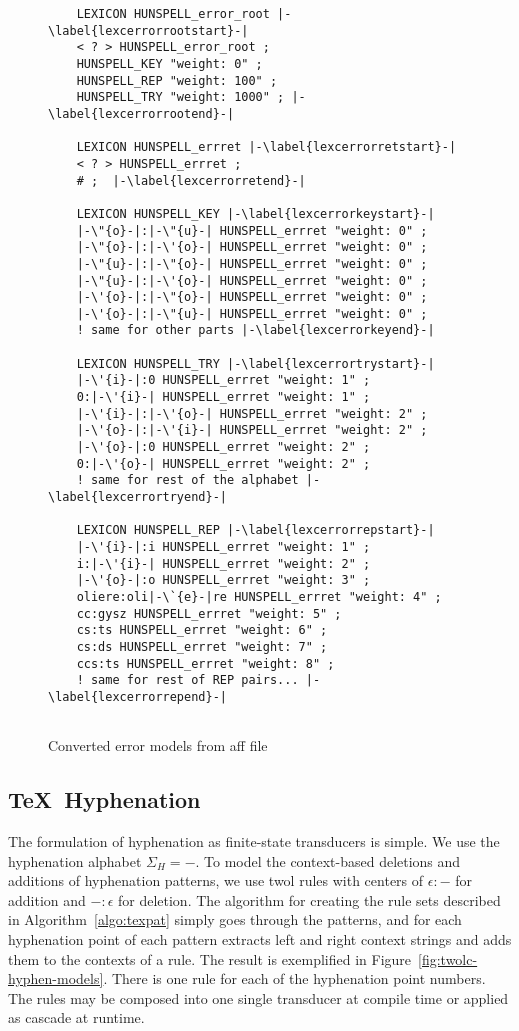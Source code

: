\documentclass[a4paper,conference]{IEEEtran}
\begin{document}
\begin{figure}[tbp]
  \centering
  \begin{lstlisting}
    LEXICON HUNSPELL_error_root |-\label{lexcerrorrootstart}-|
    < ? > HUNSPELL_error_root ; 
    HUNSPELL_KEY "weight: 0" ;
    HUNSPELL_REP "weight: 100" ;
    HUNSPELL_TRY "weight: 1000" ; |-\label{lexcerrorrootend}-|
    
    LEXICON HUNSPELL_errret |-\label{lexcerrorretstart}-|
    < ? > HUNSPELL_errret ; 
    # ;  |-\label{lexcerrorretend}-|
    
    LEXICON HUNSPELL_KEY |-\label{lexcerrorkeystart}-|
    |-\"{o}-|:|-\"{u}-| HUNSPELL_errret "weight: 0" ; 
    |-\"{o}-|:|-\'{o}-| HUNSPELL_errret "weight: 0" ;
    |-\"{u}-|:|-\"{o}-| HUNSPELL_errret "weight: 0" ;
    |-\"{u}-|:|-\'{o}-| HUNSPELL_errret "weight: 0" ;
    |-\'{o}-|:|-\"{o}-| HUNSPELL_errret "weight: 0" ;
    |-\'{o}-|:|-\"{u}-| HUNSPELL_errret "weight: 0" ; 
    ! same for other parts |-\label{lexcerrorkeyend}-|
    
    LEXICON HUNSPELL_TRY |-\label{lexcerrortrystart}-|
    |-\'{i}-|:0 HUNSPELL_errret "weight: 1" ;
    0:|-\'{i}-| HUNSPELL_errret "weight: 1" ;
    |-\'{i}-|:|-\'{o}-| HUNSPELL_errret "weight: 2" ;
    |-\'{o}-|:|-\'{i}-| HUNSPELL_errret "weight: 2" ;
    |-\'{o}-|:0 HUNSPELL_errret "weight: 2" ;
    0:|-\'{o}-| HUNSPELL_errret "weight: 2" ;
    ! same for rest of the alphabet |-\label{lexcerrortryend}-|
    
    LEXICON HUNSPELL_REP |-\label{lexcerrorrepstart}-|
    |-\'{i}-|:i HUNSPELL_errret "weight: 1" ;
    i:|-\'{i}-| HUNSPELL_errret "weight: 2" ;
    |-\'{o}-|:o HUNSPELL_errret "weight: 3" ;       
    oliere:oli|-\`{e}-|re HUNSPELL_errret "weight: 4" ; 
    cc:gysz HUNSPELL_errret "weight: 5" ;       
    cs:ts HUNSPELL_errret "weight: 6" ;       
    cs:ds HUNSPELL_errret "weight: 7" ;       
    ccs:ts HUNSPELL_errret "weight: 8" ;  
    ! same for rest of REP pairs... |-\label{lexcerrorrepend}-|
    
  \end{lstlisting}
  \caption{Converted error models from aff file}
  \label{fig:lexc-error-models}
\end{figure}

\subsection{\TeX\ Hyphenation}

The formulation of hyphenation as finite-state transducers is simple.  We use
the hyphenation alphabet $\Sigma_H = {-}$. To model the context-based deletions
and additions of hyphenation patterns, we use twol rules with centers of
$\epsilon:-$ for addition and $-:\epsilon$ for deletion. The algorithm for
creating the rule sets described in Algorithm~\ref{algo:texpat} simply goes
through the patterns, and for each hyphenation point of each pattern extracts
left and right context strings and adds them to the contexts of a rule. 
The result is exemplified in Figure~\ref{fig:twolc-hyphen-models}.
There is one rule for each of the hyphenation point numbers. The rules may be 
composed into one single transducer at compile time or applied as cascade at runtime.
\end{document}
